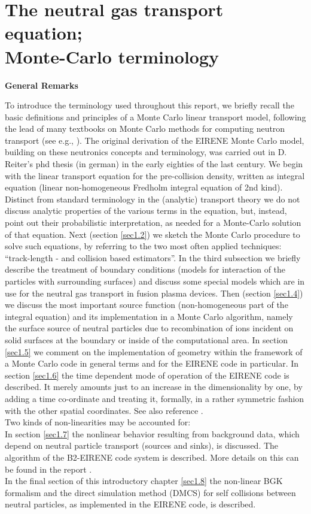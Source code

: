 \chapter{The neutral gas transport equation;~~\\
Monte-Carlo terminology} \label{sec1} {\bf General
Remarks}
\medskip\noindent


To introduce the terminology used throughout this report, we
briefly recall the basic definitions and principles of a Monte
Carlo linear transport model, following the lead of many textbooks
on Monte Carlo methods for computing neutron transport (see e.g.,
\cite{kn:Spanier69a}). The original derivation of the EIRENE Monte Carlo
model, building on these neutronics concepts and terminology,
was carried out in D. Reiter's phd thesis (in german) \cite{kn:Reiter84a}
in the early eighties of the last century.
We begin with the linear transport equation
for the pre-collision density, written as integral equation
(linear non-homogeneous Fredholm integral equation of 2nd kind).
Distinct from standard terminology in the (analytic) transport
theory we do not discuss analytic properties of the various terms
in the equation, but, instead, point out their probabilistic
interpretation, as needed for a Monte-Carlo solution of that
equation. Next (section \ref{sec1.2}) we sketch the Monte Carlo
procedure to solve such equations, by referring to the two most
often applied techniques: ``track-length - and collision based
estimators''. In the third subsection we briefly describe the
treatment of boundary conditions (models for interaction of the
particles with surrounding surfaces) and discuss some special
models which are in use for the neutral gas transport in fusion
plasma devices. Then (section \ref{sec1.4}) we discuss the most
important source function (non-homogeneous part of the integral
equation) and its implementation in a Monte Carlo algorithm,
namely the surface source of neutral particles due to
recombination of ions incident on solid surfaces at the boundary
or inside of the computational area. In section \ref{sec1.5} we
comment on the implementation of geometry within the framework of
a Monte Carlo code in general terms and for the EIRENE code in
particular. In section \ref{sec1.6} the time dependent mode of
operation of the EIRENE code is described. It merely amounts just
to an increase in the dimensionality by one, by adding a time
co-ordinate and treating it, formally, in a rather symmetric
fashion with the other spatial coordinates. See also reference
\cite{kn:Reiter94}.
\\
Two kinds of non-linearities may be accounted for:
\\
In section \ref{sec1.7} the nonlinear behavior resulting from
background data, which depend on neutral particle transport
(sources and sinks), is discussed. The algorithm of the B2-EIRENE
code system \cite{kn:Reiter92b}
is described. More details on this can be found in the report \cite{kn:Maddison94}.\\
In the final section of this introductory chapter \ref{sec1.8} the
non-linear BGK formalism and the direct simulation method (DMCS)
for self collisions between neutral particles, as implemented in
the EIRENE code, is described.
\newpage

